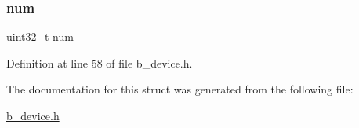 \subsubsection{\texorpdfstring{num}{num}}
{\footnotesize\ttfamily uint32\+\_\+t num}



Definition at line 58 of file b\+\_\+device.\+h.



The documentation for this struct was generated from the following file\+:\begin{DoxyCompactItemize}
\item 
\mbox{\hyperlink{b__device_8h}{b\+\_\+device.\+h}}\end{DoxyCompactItemize}
